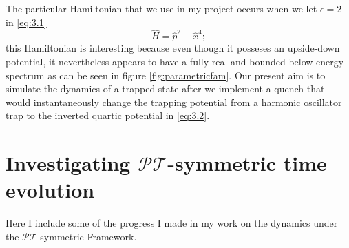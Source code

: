 \documentclass[12pt, a4paper]{report}
\newenvironment{Figure}
    {\par\medskip\noindent\minipage{\linewidth}}
    {\endminipage\par\medskip}
\newcommand\PT{\(\mathcal{PT}\)}
\begin{document}
The particular Hamiltonian that we use in my project occurs when we let $\epsilon = 2$ in \ref{eq:3.1}
\begin{equation}\label{eq:3.2}
\hat{H} = \hat{p}^2 - \hat{x}^{4};
\end{equation}
this Hamiltonian is interesting because even though it posseses an upside-down potential, it nevertheless appears to have a fully real and bounded below energy spectrum\cite{UpsideDownPotentials} as can be seen in figure \ref{fig:parametricfam}. Our present aim is to simulate the dynamics of a trapped state after we implement a quench that would instantaneously change the trapping potential from a harmonic oscillator trap to the inverted quartic potential in \ref{eq:3.2}.


\section{Investigating \PT-symmetric time evolution}
Here I include some of the progress I made in my work on the dynamics under the \PT-symmetric Framework. 




\end{document}
